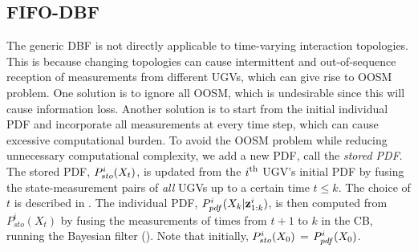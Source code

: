 	\subsection{FIFO-DBF}
	The generic DBF is not directly applicable to time-varying interaction topologies. 
	This is because changing topologies can cause intermittent and out-of-sequence reception of measurements from different UGVs, which can give rise to OOSM problem.
	One solution is to ignore all OOSM, which is undesirable since this will cause information loss.
	Another solution is to start from the initial individual PDF and incorporate all measurements at every time step, which can cause excessive computational burden.
	To avoid the OOSM problem while reducing unnecessary computational complexity, we add a new PDF, call the \textit{stored PDF}.
	The stored PDF, $P^{i}_{sto}(X_t)$, is updated from the $i^\text{th}$ UGV's initial PDF by fusing the state-measurement pairs of \textit{all} UGVs up to a certain time $t\le k$.
	The choice of $t$ is described in .
	The individual PDF, $P^i_{pdf}(X_k|\mathbf{z}^i_{1:k})$, is then computed from $P^i_{sto}(X_t)$ by fusing the measurements of times from $t+1$ to $k$ in the CB, running the Bayesian filter ().
	Note that initially, $P^{i}_{sto}(X_0)$ = $P^i_{pdf}(X_0)$.
	
